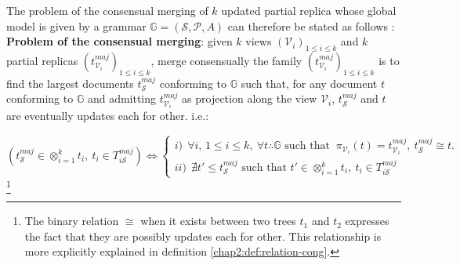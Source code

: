 The problem of the consensual merging of $k$ updated partial replica whose global model is given by a grammar $\mathbb{G}=\left(\mathcal{S},\mathcal{P},A\right)$ can therefore be stated as follows :\\
\textbf{Problem of the consensual merging}: given $k$ views $(\mathcal{V}_i)_{1 \leq i\leq k}$ and $k$ partial replicas $(t_{\mathcal{V}_i}^{maj})_{1 \leq i\leq k}$, merge consensually the family $(t_{\mathcal{V}_i}^{maj})_{1 \leq i\leq k}$ is to find the largest documents $t^{maj}_{\mathcal{S}}$ conforming to $\mathbb{G}$ such that, for any document $t$ conforming to $\mathbb{G}$ and admitting $t_{\mathcal{V}_i}^{maj}$ as projection along the view ${\mathcal{V}_i}$, $t^{maj}_{\mathcal{S}}$ and $t$ are eventually updates each for other. i.e.:
\begin{center}
$ 
\left( t^{maj}_{\mathcal{S}} \in \otimes_{i=1}^{k} t_i,  ~t_i \in T_{i\mathcal{S}}^{maj} \right) \Leftrightarrow 
\left\{ \begin{array}{l}
	i) ~~	\forall i, \, 1\leq i \leq k, ~ \forall t \therefore \mathbb{G} \mbox{ such that }~ \pi_{\mathcal{V}_i}(t) =   t_{\mathcal{V}_i}^{maj} ,~t^{maj}_{\mathcal{S}} \cong t. \\
	ii) ~~\nexists t' \leq t^{maj}_{\mathcal{S}} \mbox{ such that } t' \in  \otimes_{i=1}^{k} t_i,  ~t_i \in T_{i\mathcal{S}}^{maj} 
\end{array}\right.
$\footnote{The binary relation $\cong$ when it exists between two trees $t_1$ and $t_2$ expresses the fact that they are possibly updates each for other. This relationship is more explicitly explained in definition \ref{chap2:def:relation-cong}.}
\end{center}

